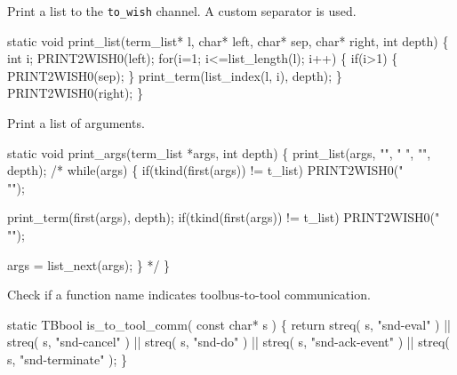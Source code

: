 
Print a list to the {\tt to\_wish} channel. A custom separator is used.

\nwenddocs{}\endmoddef\let\nwnotused=\nwoutput{}\nwstartdeflinemarkup{}\nwenddeflinemarkup
static void print_list(term_list* l, char* left, char* sep, char* right, int depth)
\{
   int i;
   PRINT2WISH0(left);
   for(i=1; i<=list_length(l); i++) \{
      if(i>1) \{
         PRINT2WISH0(sep);
      \}
      print_term(list_index(l, i), depth);
   \}
   PRINT2WISH0(right);
\}
\nwendcode{}\nwdocspar


Print a list of arguments.

\nwenddocs{}\endmoddef\let\nwnotused=\nwoutput{}\nwstartdeflinemarkup{}\nwenddeflinemarkup
static void print_args(term_list *args, int depth)
\{
  print_list(args, "", " ", "", depth);
/*  while(args) \{
    if(tkind(first(args)) != t_list)
      PRINT2WISH0(" \\"");

    print_term(first(args), depth);
    if(tkind(first(args)) != t_list)
      PRINT2WISH0("\\"");

    args = list_next(args);
  \}
*/
\}
\nwendcode{}\nwdocspar


Check if a function name indicates toolbus-to-tool communication.

\nwenddocs{}\endmoddef\let\nwnotused=\nwoutput{}\nwstartdeflinemarkup{}\nwenddeflinemarkup
static TBbool is_to_tool_comm( const char* s )
\{
   return streq( s, "snd-eval" )      || 
          streq( s, "snd-cancel" )    ||
          streq( s, "snd-do" )        || 
          streq( s, "snd-ack-event" ) ||
          streq( s, "snd-terminate" );
\}
\nwendcode{}\nwdocspar

